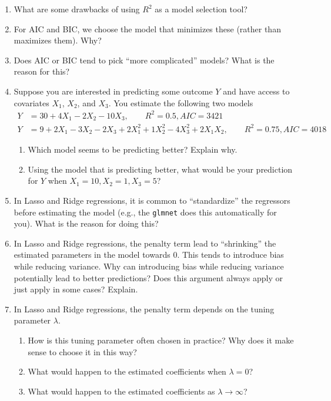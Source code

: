 \documentclass[
  letterpaper,
  DIV=11,
  numbers=noendperiod]{scrreprt}
\begin{document}
\begin{enumerate}
\def\labelenumi{\arabic{enumi}.}
\item
  What are some drawbacks of using \(R^2\) as a model selection tool?
\item
  For AIC and BIC, we choose the model that minimizes these (rather than
  maximizes them). Why?
\item
  Does AIC or BIC tend to pick ``more complicated'' models? What is the
  reason for this?
\item
  Suppose you are interested in predicting some outcome \(Y\) and have
  access to covariates \(X_1\), \(X_2\), and \(X_3\). You estimate the
  following two models \begin{align*}
    Y &= 30 + 4 X_1 - 2 X_2 - 10 X_3, \qquad R^2=0.5, AIC=3421 \\
    Y &= 9 + 2 X_1 - 3 X_2 - 2 X_3 + 2 X_1^2 + 1 X_2^2 - 4 X_3^2 + 2 X_1 X_2, \qquad R^2 = 0.75, AIC=4018
  \end{align*}

  \begin{enumerate}
  \def\labelenumii{\alph{enumii})}
  \item
    Which model seems to be predicting better? Explain why.
  \item
    Using the model that is predicting better, what would be your
    prediction for \(Y\) when \(X_1=10, X_2=1, X_3=5\)?
  \end{enumerate}
\item
  In Lasso and Ridge regressions, it is common to ``standardize'' the
  regressors before estimating the model (e.g., the \texttt{glmnet} does
  this automatically for you). What is the reason for doing this?
\item
  In Lasso and Ridge regressions, the penalty term lead to ``shrinking''
  the estimated parameters in the model towards 0. This tends to
  introduce bias while reducing variance. Why can introducing bias while
  reducing variance potentially lead to better predictions? Does this
  argument always apply or just apply in some cases? Explain.
\item
  In Lasso and Ridge regressions, the penalty term depends on the tuning
  parameter \(\lambda\).

  \begin{enumerate}
  \def\labelenumii{\alph{enumii})}
  \item
    How is this tuning parameter often chosen in practice? Why does it
    make sense to choose it in this way?
  \item
    What would happen to the estimated coefficients when \(\lambda=0\)?
  \item
    What would happen to the estimated coefficients as
    \(\lambda \rightarrow \infty\)?
  \end{enumerate}
\end{enumerate}
\end{document}
